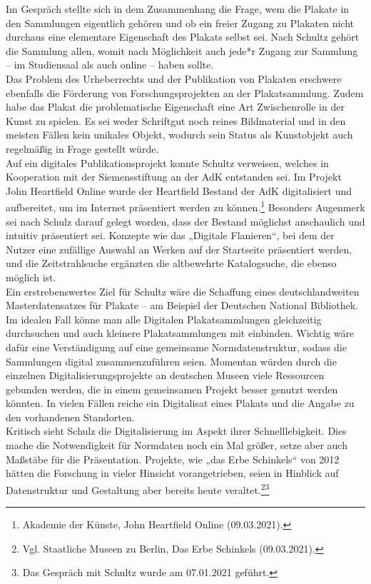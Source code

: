 \documentclass[a4paper,12pt,ngerman]{article}
\begin{document}
Im Gespräch stellte sich in dem Zusammenhang die Frage, wem die Plakate in den Sammlungen eigentlich gehören und ob ein freier Zugang zu Plakaten nicht durchaus eine elementare Eigenschaft des Plakats selbst sei. Nach Schultz gehört die Sammlung allen, womit nach Möglichkeit auch jede*r Zugang zur Sammlung – im Studiensaal als auch online – haben sollte. \\
Das Problem des Urheberrechts und der Publikation von Plakaten erschwere ebenfalls die Förderung von Forschungsprojekten an der Plakatsammlung. Zudem habe das Plakat die problematische Eigenschaft eine Art Zwischenrolle in der Kunst zu spielen. Es sei weder Schriftgut noch reines Bildmaterial und in den meisten Fällen kein unikales Objekt, wodurch sein Status als Kunstobjekt auch regelmäßig in Frage gestellt würde. \\
Auf ein digitales Publikationsprojekt konnte Schultz verweisen, welches in Kooperation mit der Siemensstiftung an der AdK entstanden sei. Im Projekt John Heartfield Online wurde der Heartfield Bestand der AdK digitalisiert und aufbereitet, um im Internet präsentiert werden zu können.\footnote{Akademie der Künste, John Heartfield Online (09.03.2021).} Besonders Augenmerk sei nach Schulz darauf gelegt worden, dass der Bestand möglichst anschaulich und intuitiv präsentiert sei. Konzepte wie das „Digitale Flanieren“, bei dem der Nutzer eine zufällige Auswahl an Werken auf der Startseite präsentiert werden, und die Zeitstrahlsuche ergänzten die altbewehrte Katalogsuche, die ebenso möglich ist. \\
Ein erstrebenswertes Ziel für Schultz wäre die Schaffung eines deutschlandweiten Masterdatensatzes für Plakate – am Beispiel der Deutschen National Bibliothek. Im idealen Fall könne man alle Digitalen Plakatsammlungen gleichzeitig durchsuchen und auch kleinere Plakatsammlungen mit einbinden. Wichtig wäre dafür eine Verständigung auf eine gemeinsame Normdatenstruktur, sodass die Sammlungen digital zusammenzuführen seien. Momentan würden durch die einzelnen Digitalisierungsprojekte an deutschen Museen viele Ressourcen gebunden werden, die in einem gemeinsamen Projekt besser genutzt werden könnten. In vielen Fällen reiche ein Digitalisat eines Plakats und die Angabe zu den vorhandenen Standorten. \\
Kritisch sieht Schulz die Digitalisierung im Aspekt ihrer Schnelllebigkeit. Dies mache die Notwendigkeit für Normdaten noch ein Mal größer, setze aber auch Maßstäbe für die Präsentation. Projekte, wie „das Erbe Schinkels“ von 2012 hätten die Forschung in vieler Hinsicht vorangetrieben, seien in Hinblick auf Datenstruktur und Gestaltung aber bereits heute veraltet.\footnote{Vgl. Staatliche Museen zu Berlin, Das Erbe Schinkels (09.03.2021).}\footnote{Das Gespräch mit Schultz wurde am 07.01.2021 geführt.}
\end{document}
